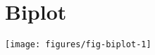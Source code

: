 \documentclass[a4paper,11pt]{article}\usepackage[]{graphicx}\usepackage[]{color}
\makeatletter
\def\maxwidth{ %
  \ifdim\Gin@nat@width>\linewidth
    \linewidth
  \else
    \Gin@nat@width
  \fi
}
\newenvironment{knitrout}{}{} %
\makeatother
\begin{document}
\newpage

\section{Biplot}
\begin{knitrout}
\color{fgcolor}

{\centering \texttt{[image: figures/fig-biplot-1]} 

}



\end{knitrout}

\end{document}
